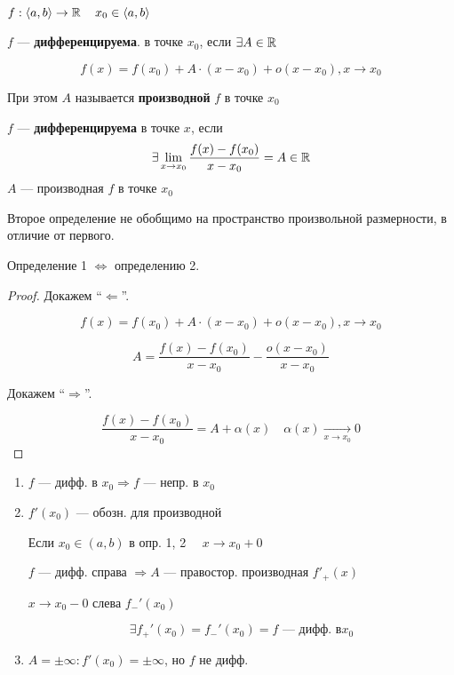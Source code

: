 \begin{definition}
    $f:\langle a,b\rangle\to\operatorname*{\mathbb{R}} \quad x_0\in\langle a,b\rangle$

    $f$ --- \textbf{дифференцируема}. в точке $x_0$, если $\exists A\in\operatorname*{\mathbb{R}}$

    $$f(x)=f(x_0)+A\cdot(x-x_0)+o(x-x_0), x\to x_0$$

    При этом $A$ называется \textbf{производной} $f$ в точке $x_0$
\end{definition}
\begin{definition}
    $f$ --- \textbf{дифференцируема} в точке $x$, если $$\exists \lim\limits_{x\to x_0}\frac{f(x)-f(x_0)}{x-x_0}=A\in\operatorname*{\mathbb{R}}$$
    $A$ --- производная $f$ в точке $x_0$
\end{definition}
\begin{remark}
    Второе определение не обобщимо на пространство произвольной размерности, в отличие от первого.
\end{remark}
\begin{theorem}
    Определение 1 $\Leftrightarrow$ определению 2.
\end{theorem}
\begin{proof}
    Докажем ``$\Leftarrow$''.
    
    $$f(x)=f(x_0)+A\cdot(x-x_0)+o(x-x_0), x\to x_0$$

    $$A=\frac{f(x)-f(x_0)}{x-x_0} - \frac{o(x-x_0)}{x-x_0}$$

    Докажем ``$\Rightarrow$''.

    $$\frac{f(x)-f(x_0)}{x-x_0}=A+\alpha(x) \quad \alpha(x)\xrightarrow[x\to x_0]{} 0$$
\end{proof}
\begin{remark}
    \begin{enumerate}
        \item $f$ --- дифф. в $x_0 \Rightarrow f$ --- непр. в $x_0$
        \item $f'(x_0)$ --- обозн. для производной
        
        Если $x_0\in(a, b)$ в опр. 1, 2 $\quad x\to x_0+0$

        $f$ --- дифф. справа $\Rightarrow A$ --- правостор. производная $f'_+(x)$

        $x\to x_0-0$ слева $f_-'(x_0)$

        $$\exists f_+'(x_0)=f_-'(x_0)=f \text{ --- дифф. в} x_0$$
        
        \item $A=\pm\infty: f'(x_0)=\pm\infty$, но $f$ не дифф.
    \end{enumerate}
\end{remark}

